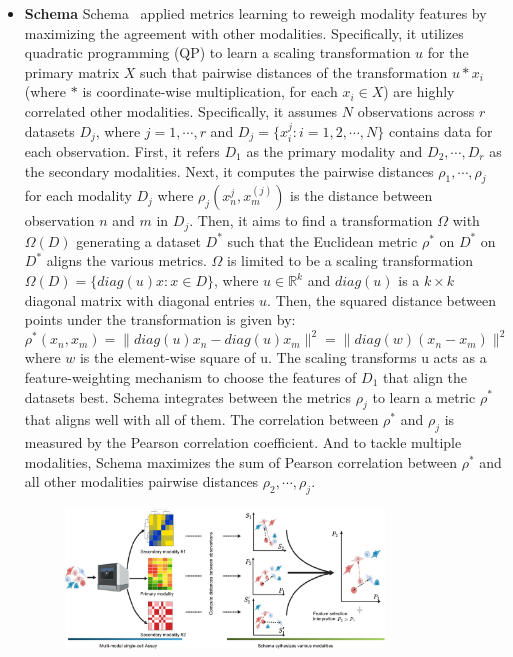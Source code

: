 \begin{itemize}
    \item \textbf{Schema}
    Schema~\citep{singh2021schema}  applied metrics learning to reweigh modality features by maximizing the agreement with other modalities. Specifically, it utilizes quadratic programming (QP) to learn a scaling transformation $u$ for the primary matrix $X$ such that pairwise distances of the transformation $u *  x_i$ (where $*$ is coordinate-wise multiplication, for each $x_i\in X$) are highly correlated other modalities. Specifically, it assumes $N$ observations across $r$ datasets $D_j$, where $j=1,\cdots,r$ and $D_j  = \{x_i^{j}: i = 1,2,\cdots,N\}$ contains data for each observation. First, it refers $D_1$ as the primary modality and $D_2,\cdots,D_r$ as the secondary modalities. Next, it computes the pairwise distances $\rho_1,\cdots,\rho_j$ for each modality $D_j$ where $\rho_j(x_n^{j}, x_m^{(j)})$ is the distance between observation $n$ and $m$ in $D_j$. Then, it aims to find a transformation $\Omega$ with $\Omega(D)$ generating a dataset $D^{*}$ such that the Euclidean metric $\rho^{*}$ on $D^{*}$ on $D^{*}$ aligns the various metrics. $\Omega$ is limited to be a scaling transformation $\Omega(D) = \{diag(u)x: x \in D\}$, where $u \in \mathbb{R}^{k}$ and  $diag(u)$ is a  $k\times k$ diagonal matrix with diagonal entries $u$. Then, the squared distance between points under the transformation is given by:
    \begin{equation}
    \rho^{*}(x_n, x_m) = \|diag(u)x_n - diag(u)x_m\|^2 = \|diag(w)(x_n - x_m)\|^2 
    \end{equation}
    where $w$ is the element-wise square of u. The scaling transforms u acts as a feature-weighting mechanism to choose the features of $D_1$ that align the datasets best. Schema integrates between the metrics $\rho_j$ to learn a metric $\rho^{*}$ that aligns well with all of them. The correlation between $\rho^{*}$ and $\rho_j$ is measured by the Pearson correlation coefficient. And to tackle multiple modalities, Schema maximizes the sum of Pearson correlation between $\rho^{*}$ and all other modalities pairwise distances $\rho_2,\cdots,\rho_j$.
    \begin{figure}[!ht]
    	\centering
    	\includegraphics[width=0.8\textwidth]{Alg_Schema/fig}

\end{figure}
\end{itemize}
